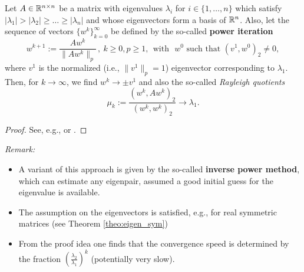 \begin{frame}
 \begin{theorem}
 Let $A\in{\mathbb{R}}^{n\times n}$ be a matrix with eigenvalues $\lambda_i$ for $i \in \{1,\ldots, n\}$ which satisfy
 $
 |\lambda_1|>|\lambda_2|\ge\ldots\ge|\lambda_n|
 $
and whose eigenvectors form a basis of ${\mathbb{R}}^n$. Also, let the sequence of vectors $\{w^k\}_{k=0}^\infty$ be defined by the so-called \textbf{power iteration}
 \[
 w^{k+1}:=\frac{Aw^k}{\|Aw^k\|_p}\, ,\ k\ge 0, p\geq 1,~~\text{with}~~ \ w^0 \text{ such that } (v^1, w^0)_2 \neq 0,
 \]
 where $v^1$ is the normalized (i.e., $\|v^1\|_p=1$) eigenvector corresponding to $\lambda_1$. Then, for ${k\to\infty}$, we find $w^k\mathop{\longrightarrow} \pm v^1$ and also the so-called \emph{Rayleigh quotients} $$\mu_k:=\frac{(w^k,Aw^k)_2}{(w^k,w^k)_2}\mathop{\longrightarrow}\lambda_1.$$
 \end{theorem}\small
\begin{proof}
	See, e.g., \cite[Satz 7.3]{Rannacher} or \cite[Theorem 27.1 ]{TreBau}. 
\end{proof}
\textit{Remark:} 
\begin{itemize}
 	\item A variant of this approach is given by the so-called \textbf{inverse power method}, which can estimate any eigenpair, assumed a good initial guess for the eigenvalue is available.
 	\item The assumption on the eigenvectors is satisfied, e.g., for real symmetric matrices (see Theorem \ref{theo:eigen_sym})
 	\item From the proof idea one finds that the convergence speed is determined by the fraction $\left(\tfrac{ \lambda_2}{ \lambda_1}\right)^k$ (potentially very slow).
\end{itemize}
\end{frame}




